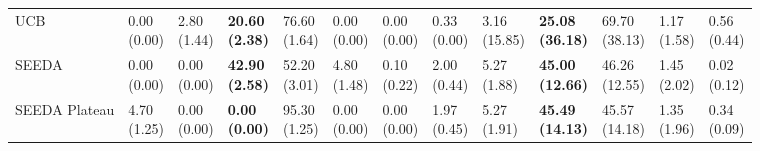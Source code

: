 \begin{table}[H]
\begin{tabular}{lllllllllllll}
UCB & \makecell{0.00 \\ (0.00)} & \makecell{2.80 \\ (1.44)} & {\cellcolor[HTML]{C8E6C9}} \bfseries \makecell{20.60 \\ (2.38)} & \makecell{76.60 \\ (1.64)} & \makecell{0.00 \\ (0.00)} & \makecell{0.00 \\ (0.00)} & \makecell{0.33 \\ (0.00)} & \makecell{3.16 \\ (15.85)} & {\cellcolor[HTML]{C8E6C9}} \bfseries \makecell{25.08 \\ (36.18)} & \makecell{69.70 \\ (38.13)} & \makecell{1.17 \\ (1.58)} & \makecell{0.56 \\ (0.44)} \\
SEEDA & \makecell{0.00 \\ (0.00)} & \makecell{0.00 \\ (0.00)} & {\cellcolor[HTML]{C8E6C9}} \bfseries \makecell{42.90 \\ (2.58)} & \makecell{52.20 \\ (3.01)} & \makecell{4.80 \\ (1.48)} & \makecell{0.10 \\ (0.22)} & \makecell{2.00 \\ (0.44)} & \makecell{5.27 \\ (1.88)} & {\cellcolor[HTML]{C8E6C9}} \bfseries \makecell{45.00 \\ (12.66)} & \makecell{46.26 \\ (12.55)} & \makecell{1.45 \\ (2.02)} & \makecell{0.02 \\ (0.12)} \\
SEEDA Plateau & \makecell{4.70 \\ (1.25)} & \makecell{0.00 \\ (0.00)} & {\cellcolor[HTML]{C8E6C9}} \bfseries \makecell{0.00 \\ (0.00)} & \makecell{95.30 \\ (1.25)} & \makecell{0.00 \\ (0.00)} & \makecell{0.00 \\ (0.00)} & \makecell{1.97 \\ (0.45)} & \makecell{5.27 \\ (1.91)} & {\cellcolor[HTML]{C8E6C9}} \bfseries \makecell{45.49 \\ (14.13)} & \makecell{45.57 \\ (14.18)} & \makecell{1.35 \\ (1.96)} & \makecell{0.34 \\ (0.09)} \\
\bottomrule
\end{tabular}
\end{table}
